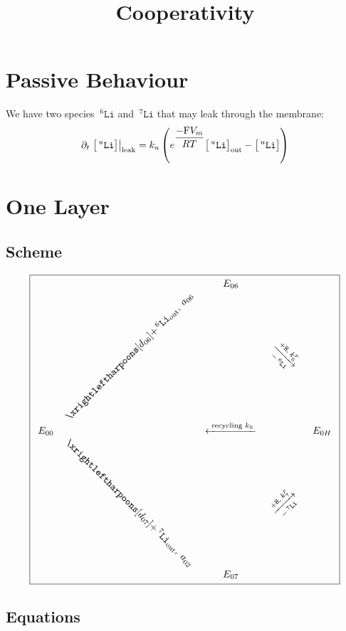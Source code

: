 \documentclass[aps,onecolumn,11pt]{revtex4}
\newcommand{\mychem}[1]{\mathtt{#1}}
\newcommand{\myconc}[1]{\big[#1\big]}
\newcommand{\Faraday}{\mathrm{F}}
\newcommand{\spLi}[1]{{\!~^{#1}\mychem{Li}}}
\newcommand{\Li}[1]{\myconc{\spLi{#1}}}
\newcommand{\spproton}{\mychem{H}}
\newcommand{\myleak}[1]{\left.{#1}\right\vert_{\mathrm{leak}}}
\newcommand{\myout}[1]{{#1}_{\tiny\mathrm{out}}}
\newcommand{\LiOut}[1]{\myout{\Li{#1}}}
\newcommand{\spLiOut}[1]{\myout{\spLi{#1}}}
\newcommand{\myrotate}[2]{\rotatebox[origin=c]{#1}{#2}}
\begin{document}
\title{Cooperativity}
\maketitle


\section{Passive Behaviour}
We have two species $\spLi{6}$ and $\spLi{7}$ that may leak through the membrane:
\begin{equation}
	\partial_t \myleak{\Li{u}} = k_u \left( e^{\dfrac{-\Faraday V_m }{RT}} \LiOut{u} - \Li{u}\right)
\end{equation}

\section{One Layer}

\subsection{Scheme}
{
\Large
\begin{equation}
\boxed{
\begin{array}{ccccc}
 & & E_{06}  &  & \\
 &  \myrotate{45}{$\xrightleftharpoons[d_{06}]{+\spLiOut{6},\;a_{06}}$} &   & \myrotate{-45}{$\xrightarrow[-\spLi{6}]{+ \spproton, \; k^p_6}$} &  \\
E_{00}  &  & \xleftarrow{\text{ recycling } k_h } &   & E_{0H} \\
  & \myrotate{-45}{$\xrightleftharpoons[d_{07}]{+\spLiOut{7},\;a_{02}}$} &   & \myrotate{+45}{$\xrightarrow[-\spLi{7}]{+ \spproton, \; k^p_7}$} & \\
 & & E_{07} & & \\
 \end{array}
 }
\end{equation}
}

\subsection{Equations}
\end{document}
